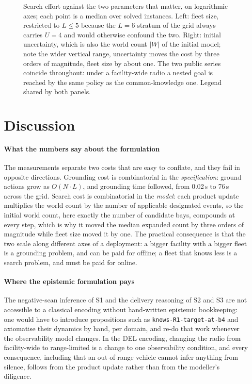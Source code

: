 \documentclass[11pt,a4paper]{article}
\theoremstyle{definition}
\begin{document}
\begin{figure}[H]
\centering
\hfill
\caption{Search effort against the two parameters that matter, on logarithmic
axes; each point is a median over solved instances. Left: fleet size,
restricted to $L\le5$ because the $L=6$ stratum of the grid always carries
$U=4$ and would otherwise confound the two. Right: initial uncertainty, which
is also the world count $|W|$ of the initial model; note the wider vertical
range, uncertainty moves the cost by three orders of magnitude, fleet size
by about one. The two public series coincide throughout: under a facility-wide
radio a nested goal is reached by the same policy as the common-knowledge one.
Legend shared by both panels.}
\label{fig:scaling}
\end{figure}



\section{Discussion}

\paragraph{What the numbers say about the formulation}
The measurements separate two costs that are easy to conflate, and they fail in
opposite directions. Grounding cost is combinatorial in the
\emph{specification}: ground actions grow as $O(N\cdot L)$, and grounding time
followed, from 0.02\,s to 76\,s across the grid. Search cost is combinatorial
in the \emph{model}: each product update multiplies the world count by the
number of applicable designated events, so the initial world count, here
exactly the number of candidate bays, compounds at every step, which is why
it moved the median expanded count by three orders of magnitude while fleet
size moved it by one. The practical consequence is that the two scale along
different axes of a deployment: a bigger facility with a bigger fleet is a
grounding problem, and can be paid for offline; a fleet that knows less is a
search problem, and must be paid for online.

\paragraph{Where the epistemic formulation pays}
The negative-scan inference of S1 and the delivery reasoning of S2 and S3 are
not accessible to a classical encoding without hand-written epistemic
bookkeeping: one would have to introduce propositions such as
\texttt{knows-R1-target-at-b4} and axiomatise their dynamics by hand, per
domain, and re-do that work whenever the observability model changes. In the
DEL encoding, changing the radio from facility-wide to range-limited is a
change to one observability condition, and every consequence, including that
an out-of-range vehicle cannot infer anything from silence, follows from the
product update rather than from the modeller's diligence.
\end{document}
